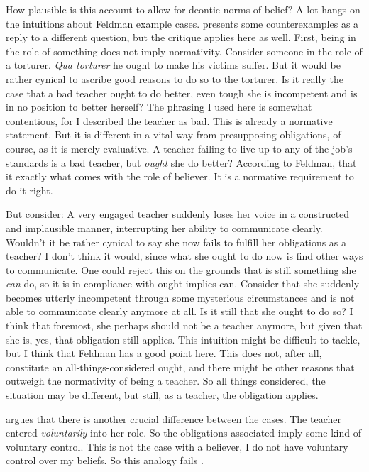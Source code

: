 \documentclass[12pt,numbers=noenddot]{scrartcl}
\begin{document}
How plausible is this account to allow for deontic norms of belief? A lot hangs on the intuitions about Feldman example cases.
\textcite[9]{Cote-BouchardForthcoming-CTBCTA} presents some counterexamples as a reply to a different question, but the critique applies here as well. First, being in the role of something does not imply normativity. Consider someone in the role of a torturer. \emph{Qua torturer} he ought to make his victims suffer. But it would be rather cynical to ascribe good reasons to do so to the torturer. Is it really the case that a bad teacher ought to do better, even tough she is incompetent and is in no position to better herself? The phrasing I used here is somewhat contentious, for I described the teacher as bad. This is already a normative statement. But it is different in a vital way from presupposing obligations, of course, as it is merely evaluative. A teacher failing to live up to any of the job's standards is a bad teacher, but \emph{ought} she do better? According to Feldman, that it exactly what comes with the role of believer. It is a normative requirement to do it right.

But consider: A very engaged teacher suddenly loses her voice in a constructed and implausible manner, interrupting her ability to communicate clearly. Wouldn't it be rather cynical to say she now fails to fulfill her obligations as a teacher? I don't think it would, since what she ought to do now is find other ways to communicate. One could reject this on the grounds that is still something she \emph{can} do, so it is in compliance with ought implies can. Consider that she suddenly becomes utterly incompetent through some mysterious circumstances and is not able to communicate clearly anymore at all. Is it still that she ought to do so? I think that foremost, she perhaps should not be a teacher anymore, but given that she is, yes, that obligation still applies. This intuition might be difficult to tackle, but I think that Feldman has a good point here. This does not, after all, constitute an all-things-considered ought, and there might be other reasons that outweigh the normativity of being a teacher. So all things considered, the situation may be different, but still, as a teacher, the obligation applies.

\textcite[686]{Peels2014-PEEADC} argues that there is another crucial difference between the cases. The teacher entered \emph{voluntarily} into her role. So the obligations associated imply some kind of voluntary control. This is not the case with a believer, I do not have voluntary control over my beliefs. So this analogy fails \autocite[687]{Peels2014-PEEADC}.
\end{document}
